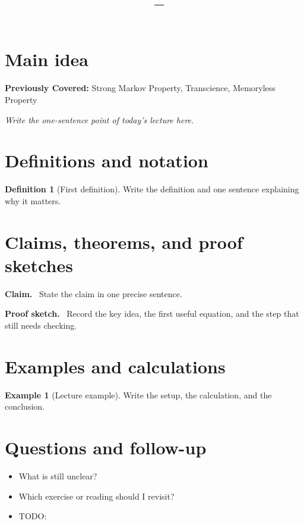 \documentclass[11pt]{article}
\title{\vspace{-1.5em}\textbf{\coursename\ -- \lecturetitle}}
\author{\studentname}
\date{\lecturedate}
\newcommand{\1}{\mathbf{1}}
\theoremstyle{notestyle}
\theoremstyle{definition}
\newtheorem{definition}[theorem]{Definition}
\newtheorem{example}[theorem]{Example}
\newenvironment{claim}{\par\noindent\textbf{Claim.}\ }{\par}
\newenvironment{proofsketch}{\par\noindent\textbf{Proof sketch.}\ }{\par}
\begin{document}
\maketitle

\section{Main idea}
\textbf{ Previously Covered:  } Strong  Markov Property, Transcience, Memoryless
Property

\textit{Write the one-sentence point of today's lecture here.}

\section{Definitions and notation}
\begin{definition}[First definition]
Write the definition and one sentence explaining why it matters.
\end{definition}

\section{Claims, theorems, and proof sketches}
\begin{claim}
State the claim in one precise sentence.
\end{claim}

\begin{proofsketch}
Record the key idea, the first useful equation, and the step that still needs checking.
\end{proofsketch}

\section{Examples and calculations}
\begin{example}[Lecture example]
Write the setup, the calculation, and the conclusion.
\end{example}

\section{Questions and follow-up}
\begin{itemize}
  \item What is still unclear?
  \item Which exercise or reading should I revisit?
  \item TODO:
\end{itemize}
\end{document}

